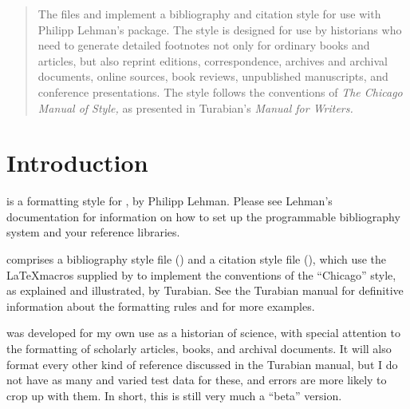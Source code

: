 \documentclass{ltxdockit}[2010/02/12]
\begin{document}

\printtitlepage

\begin{abstract} 
The files  and  implement a bibliography and citation style for use with Philipp Lehman's  package. The style is designed for use by historians who need to generate detailed footnotes not only for ordinary books and articles, but also reprint editions, correspondence, archives and archival documents, online sources, book reviews, unpublished manuscripts, and conference presentations. The  style follows the conventions of \emph{The Chicago Manual of Style,} as presented in Turabian's \emph{Manual for Writers.}

\end{abstract}

\tableofcontents




\section{Introduction} 
 is a formatting style for , by Philipp Lehman. 
Please see Lehman's documentation for information on how to set up the programmable bibliography system and your \bibtex reference libraries.

 comprises a bibliography style file () and a citation style file (), which use the \LaTeX macros supplied by  to implement the conventions of the ``Chicago'' style, as explained and illustrated, by Turabian. See the Turabian manual for definitive information about the formatting rules and for more examples.\autocites[][]{turabian:2007}

 was developed for my own use as a historian of science, with special attention to the formatting of scholarly articles, books, and archival documents. It will also format every other kind of reference discussed in the Turabian manual, but I do not have as many and varied test data for these, and errors are more likely to crop up with them. In short, this is still very much a ``beta'' version.
\end{document}
